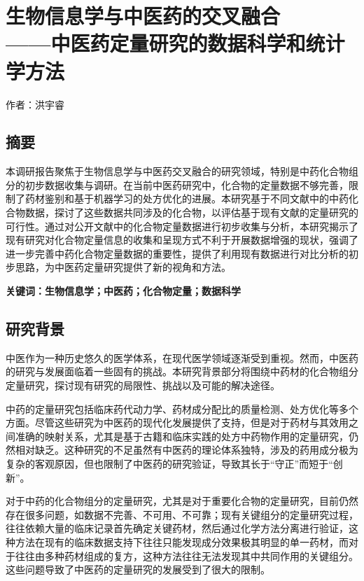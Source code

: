 \chapter{生物信息学与中医药的交叉融合 \\ ——中医药定量研究的数据科学和统计学方法}

\begin{center}
  作者：洪宇睿
\end{center}

\section*{摘要}
\begin{center}
  
  本调研报告聚焦于生物信息学与中医药交叉融合的研究领域，特别是中药化合物组分的初步数据收集与调研。在当前中医药研究中，化合物的定量数据不够完善，限制了药材鉴别和基于机器学习的处方优化的进展。本研究基于不同文献中的中药化合物数据，探讨了这些数据共同涉及的化合物，以评估基于现有文献的定量研究的可行性。通过对公开文献中的化合物定量数据进行初步收集与分析，本研究揭示了现有研究对化合物定量信息的收集和呈现方式不利于开展数据增强的现状，强调了进一步完善中药化合物定量数据的重要性，提供了利用现有数据进行对比分析的初步思路，为中医药定量研究提供了新的视角和方法。

\end{center}
\textbf{关键词：生物信息学；中医药；化合物定量；数据科学}

\section{研究背景}

中医作为一种历史悠久的医学体系，在现代医学领域逐渐受到重视。然而，中医药的研究与发展面临着一些固有的挑战。本研究背景部分将围绕中药材的化合物组分定量研究，探讨现有研究的局限性、挑战以及可能的解决途径。

中药的定量研究包括临床药代动力学、药材成分配比的质量检测、处方优化等多个方面。尽管这些研究为中医药的现代化发展提供了支持，但是对于药材与其效用之间准确的映射关系，尤其是基于古籍和临床实践的处方中药物作用的定量研究，仍然相对缺乏。这种研究的不足虽然有中医药的理论体系独特，涉及的药用成分极为复杂的客观原因，但也限制了中医药的研究验证，导致其长于“守正”而短于“创新”。\cite{Chen_Bi_Xie_Zhang_Shi_Guo_Yin_Zhang_Xin_Song_2021}

对于中药的化合物组分的定量研究，尤其是对于重要化合物的定量研究，目前仍然存在很多问题，如数据不完善、不可用、不可靠；现有关键组分的定量研究过程，往往依赖大量的临床记录首先确定关键药材，然后通过化学方法分离进行验证，这种方法在现有的临床数据支持下往往只能发现成分效果极其明显的单一药材，而对于往往由多种药材组成的复方，这种方法往往无法发现其中共同作用的关键组分。这些问题导致了中医药的定量研究的发展受到了很大的限制。\cite{Chu_Sun_Huang_Peng_Zhou_Zhang_2020}

